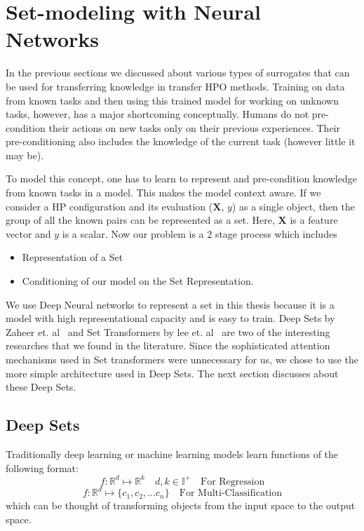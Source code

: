 \documentclass[12pt, twoside, ngerman]{report}
\begin{document}
\section{Set-modeling with Neural Networks}

In the previous sections we discussed about various types of surrogates that can be used for transferring knowledge in transfer HPO methods.
Training on data from known tasks and then using this trained model for working on unknown tasks, however,  has a major shortcoming conceptually.
Humans do not pre-condition their actions on new tasks only on their previous experiences.
Their pre-conditioning also includes the knowledge of the current task (however little it may be).


To model this concept,  one has to learn to represent and pre-condition knowledge from known tasks in a model.
This makes the model context aware.
If we consider a HP configuration and its evaluation ($\textbf{X}$, $y$) as a single object,  then the group of all the known pairs can be represented as a set.
Here,  $\textbf{X}$ is a feature vector and $y$ is a scalar.
Now our problem is a 2 stage process which includes
\begin{itemize}
\item Representation of a Set
\item Conditioning of our model on the Set Representation.
\end{itemize}


We use Deep Neural networks to represent a set in this thesis because it is a model with  high representational capacity and is easy to train.
Deep Sets by Zaheer et.  al~\cite{deepSets} and Set Transformers by lee et. al~\cite{setTransformer} are two of the interesting researches that we found in the literature.
Since the sophisticated attention mechanisms used in Set transformers were unnecessary for us,  we chose to use the more simple architecture used in Deep Sets.
The next section discusses about these Deep Sets.

\subsection{Deep Sets}\label{sec:DeepSets}
Traditionally deep learning or machine learning models learn functions of the following format:
$$
f : \mathbb{R}^d \mapsto \mathbb{R}^k \quad d,k \in \mathbb{I}^+ \quad \textrm{For Regression}
$$
$$
f : \mathbb{R}^d \mapsto \{c_1, c_2, ... c_n\}  \quad \textrm{For Multi-Classification}
$$
which can be thought of transforming objects from the input space to the output space.
\end{document}
